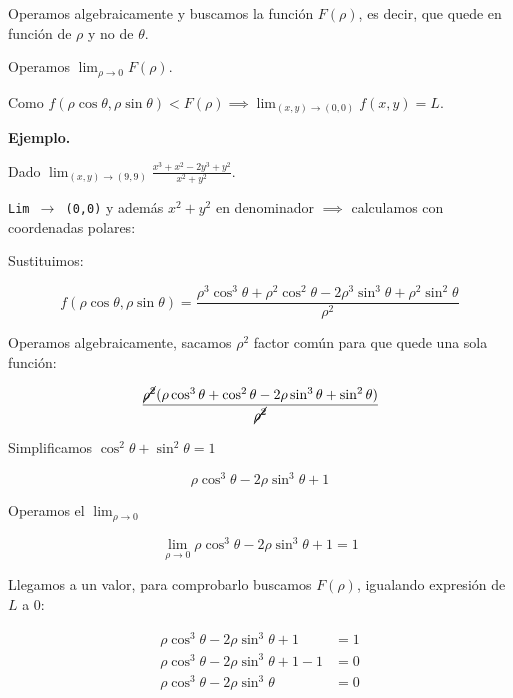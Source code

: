 Operamos algebraicamente y buscamos la función \(F(\rho)\),
es decir, que quede en función de \(\rho\) y no de \(\theta\).

Operamos \(\lim_{\rho\to0} F(\rho)\).

Como \(f(\rho\cos\theta,\rho\sin\theta) < F(\rho) \implies \lim_{(x,y)\to(0,0)}f(x,y) = L\).

\textbf{Ejemplo.}

Dado \(\lim_{(x,y)\to(9,9)}\frac{x^{3} + x^{2} - 2y^{3} + y^{2}}{x^{2} + y^{2}}\).

\texttt{Lim \(\to\) (0,0)} y además \texttt{\(x^{2} + y^{2}\)} en denominador \(\implies\) calculamos con coordenadas polares:

Sustituimos:

\begin{equation*}
    f(\rho\cos\theta,\rho\sin\theta) = \frac{\rho^{3}\cos^{3}\theta + \rho^{2}\cos^{2}\theta - 2\rho^{3}\sin^{3}\theta + \rho^{2}\sin^{2}\theta}{\rho^{2}}
\end{equation*}

Operamos algebraicamente, sacamos \(\rho^{2}\) factor común para que quede una sola función:

\begin{equation*}
    \frac{\cancel{\rho^{2}}(\rho\cos^{3}\theta + \cos^{2}\theta - 2\rho\sin^{3}\theta + \sin^{2}\theta)}{\cancel{\rho^{2}}}
\end{equation*}

Simplificamos \(\cos^{2}\theta + \sin^{2}\theta = 1\)

\begin{equation*}
    \rho\cos^{3}\theta - 2\rho\sin^{3}\theta + 1
\end{equation*}

Operamos el \(\lim_{\rho\to0}\)

\begin{equation*}
    \lim_{\rho\to0}\rho\cos^{3}\theta - 2\rho\sin^{3}\theta + 1 = \boxed{1}
\end{equation*}

Llegamos a un valor, para comprobarlo buscamos \(F(\rho)\),
igualando expresión de \(L\) a 0:

\begin{align*}
    \rho\cos^{3}\theta - 2\rho\sin^{3}\theta + 1     & = 1 \\
    \rho\cos^{3}\theta - 2\rho\sin^{3}\theta + 1 - 1 & = 0 \\
    \rho\cos^{3}\theta - 2\rho\sin^{3}\theta         & = 0 \\
\end{align*}

